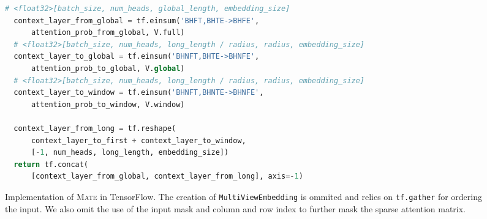 \documentclass[11pt]{article}
\newcommand{\model}{\textsc{Mate}\xspace}
\begin{document}
\begin{figure*}
\begin{center}
{\begin{lstlisting}[language=Python]
  # <float32>[batch_size, num_heads, global_length, embedding_size]
  context_layer_from_global = tf.einsum('BHFT,BHTE->BHFE',
      attention_prob_from_global, V.full)
  # <float32>[batch_size, num_heads, long_length / radius, radius, embedding_size]
  context_layer_to_global = tf.einsum('BHNFT,BHTE->BHNFE',
      attention_prob_to_global, V.global)
  # <float32>[batch_size, num_heads, long_length / radius, radius, embedding_size]
  context_layer_to_window = tf.einsum('BHNFT,BHNTE->BHNFE',
      attention_prob_to_window, V.window)
      
  context_layer_from_long = tf.reshape(
      context_layer_to_first + context_layer_to_window, 
      [-1, num_heads, long_length, embedding_size])
  return tf.concat(
      [context_layer_from_global, context_layer_from_long], axis=-1)

\end{lstlisting}
}
\caption{Implementation of \model in TensorFlow. The creation of \texttt{MultiViewEmbedding} is ommited and relies on \texttt{tf.gather} for ordering the input. We also omit the use of the input mask and column and row index to further mask the sparse attention matrix.}
\label{code}
\end{center}
\end{figure*} 
\end{document}
